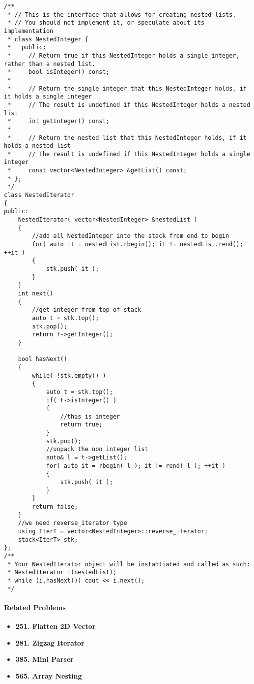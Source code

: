 \setcounter{lstlisting}{0}
\begin{lstlisting}[style=customc, caption={Stack}]
/**
 * // This is the interface that allows for creating nested lists.
 * // You should not implement it, or speculate about its implementation
 * class NestedInteger {
 *   public:
 *     // Return true if this NestedInteger holds a single integer, rather than a nested list.
 *     bool isInteger() const;
 *
 *     // Return the single integer that this NestedInteger holds, if it holds a single integer
 *     // The result is undefined if this NestedInteger holds a nested list
 *     int getInteger() const;
 *
 *     // Return the nested list that this NestedInteger holds, if it holds a nested list
 *     // The result is undefined if this NestedInteger holds a single integer
 *     const vector<NestedInteger> &getList() const;
 * };
 */
class NestedIterator
{
public:
    NestedIterator( vector<NestedInteger> &nestedList )
    {
        //add all NestedInteger into the stack from end to begin
        for( auto it = nestedList.rbegin(); it != nestedList.rend(); ++it )
        {
            stk.push( it );
        }
    }
    int next()
    {
        //get integer from top of stack
        auto t = stk.top();
        stk.pop();
        return t->getInteger();
    }

    bool hasNext()
    {
        while( !stk.empty() )
        {
            auto t = stk.top();
            if( t->isInteger() )
            {
                //this is integer
                return true;
            }
            stk.pop();
            //unpack the non integer list
            auto& l = t->getList();
            for( auto it = rbegin( l ); it != rend( l ); ++it )
            {
                stk.push( it );
            }
        }
        return false;
    }
    //we need reverse_iterator type
    using IterT = vector<NestedInteger>::reverse_iterator;
    stack<IterT> stk;
};
/**
 * Your NestedIterator object will be instantiated and called as such:
 * NestedIterator i(nestedList);
 * while (i.hasNext()) cout << i.next();
 */
\end{lstlisting}

\paragraph{Related Problems}
\begin{itemize}
\item \textbf{251. Flatten 2D Vector}
\item \textbf{281. Zigzag Iterator}
\item \textbf{385. Mini Parser}
\item \textbf{565. Array Nesting}
\end{itemize}